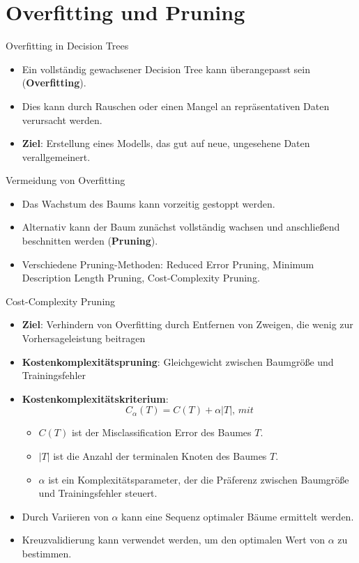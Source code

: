 \documentclass{beamer}
\begin{document}
\section{Overfitting und Pruning}

\begin{frame}{Overfitting in Decision Trees}
	\begin{itemize}
		\item {Ein vollständig gewachsener Decision Tree kann überangepasst sein (\textbf{Overfitting}).}
		\item {Dies kann durch Rauschen oder einen Mangel an repräsentativen Daten verursacht werden.}
		\item {\textbf{Ziel}: Erstellung eines Modells, das gut auf neue, ungesehene Daten verallgemeinert.}
	\end{itemize}
\end{frame}

\begin{frame}{Vermeidung von Overfitting}
	\begin{itemize}
		\item {Das Wachstum des Baums kann vorzeitig gestoppt werden.}
		\item {Alternativ kann der Baum zunächst vollständig wachsen und anschließend beschnitten werden (\textbf{Pruning}).}
		\item {Verschiedene Pruning-Methoden: Reduced Error Pruning, Minimum Description Length Pruning, Cost-Complexity Pruning.}
	\end{itemize}
\end{frame}

\begin{frame}{Cost-Complexity Pruning}
	\begin{itemize}
		\item {\textbf{Ziel}: Verhindern von Overfitting durch Entfernen von Zweigen, die wenig zur Vorhersageleistung beitragen}
		\item {\textbf{Kostenkomplexitätspruning}: Gleichgewicht zwischen Baumgröße und Trainingsfehler}
		\item \textbf{Kostenkomplexitätskriterium}: \[C_{\alpha}(T) = C(T) + \alpha|T|, \, mit\]
		\begin{itemize}
			\item $C(T)$ ist der Misclassification Error des Baumes $T$.
			\item $|T|$ ist die Anzahl der terminalen Knoten des Baumes $T$.
			\item $\alpha$ ist ein Komplexitätsparameter, der die Präferenz zwischen Baumgröße und Trainingsfehler steuert.
		\end{itemize}
		\item Durch Variieren von $\alpha$ kann eine Sequenz optimaler Bäume ermittelt werden.
		\item Kreuzvalidierung kann verwendet werden, um den optimalen Wert von $\alpha$ zu bestimmen.
	\end{itemize}
\end{frame}
\end{document}
